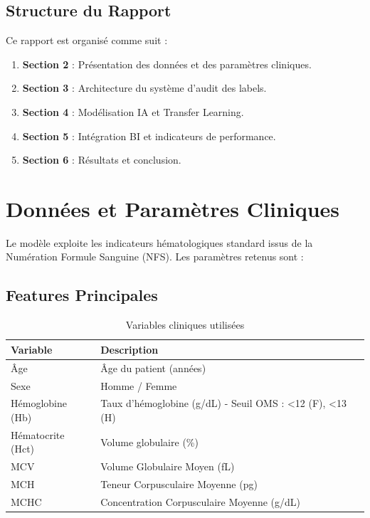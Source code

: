 \documentclass[12pt,a4paper]{article}
\begin{document}
\subsection{Structure du Rapport}
Ce rapport est organisé comme suit :
\begin{enumerate}
    \item \textbf{Section 2} : Présentation des données et des paramètres cliniques.
    \item \textbf{Section 3} : Architecture du système d'audit des labels.
    \item \textbf{Section 4} : Modélisation IA et Transfer Learning.
    \item \textbf{Section 5} : Intégration BI et indicateurs de performance.
    \item \textbf{Section 6} : Résultats et conclusion.
\end{enumerate}

\section{Données et Paramètres Cliniques}
\label{sec:donnees}

Le modèle exploite les indicateurs hématologiques standard issus de la Numération Formule Sanguine (NFS). Les paramètres retenus sont :

\subsection{Features Principales}
\begin{table}[H]
\centering
\caption{Variables cliniques utilisées}
\label{tab:features}
\begin{tabular}{p{4cm} p{8cm}}
\toprule
\textbf{Variable} & \textbf{Description} \\
\midrule
Âge & Âge du patient (années) \\
Sexe & Homme / Femme \\
Hémoglobine (Hb) & Taux d'hémoglobine (g/dL) - Seuil OMS : <12 (F), <13 (H) \\
Hématocrite (Hct) & Volume globulaire (\%) \\
MCV & Volume Globulaire Moyen (fL) \\
MCH & Teneur Corpusculaire Moyenne (pg) \\
MCHC & Concentration Corpusculaire Moyenne (g/dL) \\
\bottomrule
\end{tabular}
\end{table}
\end{document}
